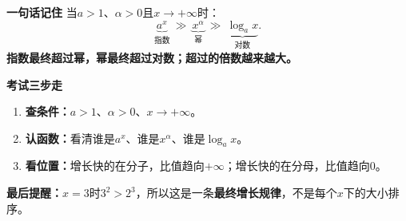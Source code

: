 \begin{summarybox}
	\textbf{\textcolor{CSummary}{一句话记住}}
	当$a>1$、$\alpha>0$且$x\to+\infty$时：
	\[
		\boxed{\underbrace{a^x}_{\text{指数}}\ \gg\
		\underbrace{x^\alpha}_{\text{幂}}\ \gg\
		\underbrace{\log_ax}_{\text{对数}}}.
	\]
	\textbf{指数最终超过幂，幂最终超过对数；超过的倍数越来越大。}

	\medskip
	\begin{center}
	
	\end{center}

	\textbf{\textcolor{CSummary}{考试三步走}}
	\begin{enumerate}[leftmargin=*,itemsep=0.25em]
		\item \textbf{查条件：}$a>1$、$\alpha>0$、$x\to+\infty$。
		\item \textbf{认函数：}看清谁是$a^x$、谁是$x^\alpha$、谁是$\log_ax$。
		\item \textbf{看位置：}增长快的在分子，比值趋向$+\infty$；增长快的在分母，比值趋向$0$。
	\end{enumerate}
	\textbf{最后提醒：}$x=3$时$3^2>2^3$，所以这是一条\textbf{最终增长规律}，不是每个$x$下的大小排序。
\end{summarybox}
